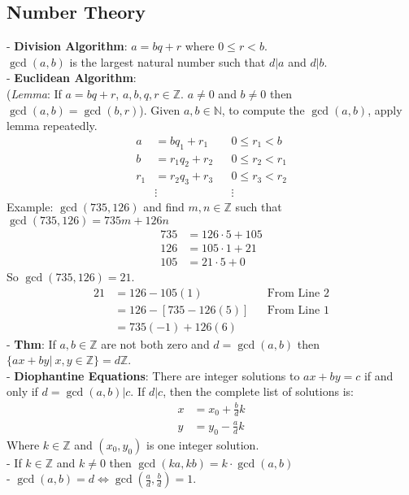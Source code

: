 \documentclass{article}
\begin{document}
\begin{multicols}{3}
  \subsection*{Number Theory}
  - \textbf{Division Algorithm}: $a = bq + r$ where $0 \leq r < b$.\\
  $\gcd(a,b)$ is the largest natural number such that $d|a$ and $d|b$.\\
  - \textbf{Euclidean Algorithm}:\\
  (\textit{Lemma}: If $a = bq + r$, $a,b,q,r \in \mathbb Z$. $a \not = 0$ and $b \not = 0$ then $\gcd(a,b) = \gcd(b,r)$).
  Given $a,b \in \mathbb N$, to compute the $\gcd(a,b)$, apply lemma repeatedly.
  \begin{align*}
    a &= bq_1 + r_1 && 0 \leq r_1 < b\\
    b &= r_1q_2 + r_2 && 0 \leq r_2 < r_1\\
    r_1 &= r_2q_3 + r_3 && 0 \leq r_3 < r_2\\
    & \vdots && \vdots
  \end{align*}
  Example:
  $\gcd(735,126)$ and find $m,n \in \mathbb Z$ such that $\gcd(735,126) = 735m + 126n$
  \begin{align}
    735 &= 126 \cdot 5 + 105\\
    126 &= 105 \cdot 1 + 21\\
    105 &= 21 \cdot 5 + 0
  \end{align}
  So $\gcd(735,126) = 21$.
  \begin{align*}
    21 &= 126 - 105(1) && \text{From Line 2}\\
    &= 126 - [735 - 126(5)] && \text{From Line 1}\\
    &= 735(-1) + 126(6)
  \end{align*}
  - \textbf{Thm}: If $a,b \in \mathbb Z$ are not both zero and $d = \gcd(a,b)$ then 
  $\{ax + by|\ x,y \in \mathbb Z\} = d\mathbb Z$.\\
  - \textbf{Diophantine Equations}: There are integer solutions to $ax + by = c$ if and only if $d = \gcd(a,b) | c$. If $d|c$, then the complete list of solutions is:
  \begin{align*}
    x &= x_0 + \frac{b}{d}k\\
    y &= y_0 - \frac{a}{d}k
  \end{align*}
  Where $k \in \mathbb Z$ and $(x_0,y_0)$ is one integer solution.\\
  - If $k \in \mathbb Z$ and $k \not = 0$ then $\gcd(ka,kb) = k\cdot \gcd(a,b)$\\
  - $\gcd(a,b) = d \iff \gcd(\frac{a}{d},\frac{b}{d}) = 1$.



\end{multicols}
\end{document}
